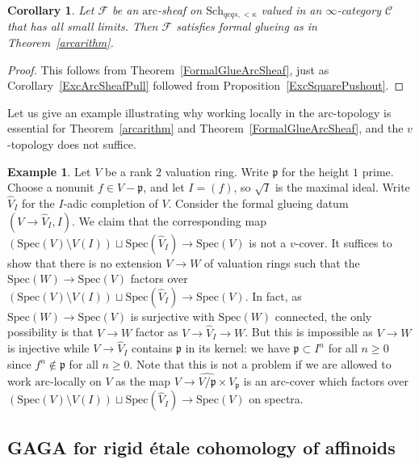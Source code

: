 \documentclass[reqno]{amsart}
\newcommand{\spec}{\mathrm{Spec}}
\newcommand{\arc}{\mathrm{arc}}
\newtheorem{corollary}[theorem]{Corollary}
\theoremstyle{definition}
\newtheorem{example}[theorem]{Example}
\begin{document}
\begin{corollary}
\label{FormalGlueArcSheafGeneral}
Let $\mathcal{F}$ be an $\arc$-sheaf on $\mathrm{Sch}_{qcqs,< \kappa}$ valued in an
$\infty$-category $\mathcal{C}$ that has all small limits. Then $\mathcal{F}$ satisfies formal glueing as in Theorem~\ref{arcarithm}. 
\end{corollary}
\begin{proof}
This follows from Theorem~\ref{FormalGlueArcSheaf}, just as Corollary~\ref{ExcArcSheafPull} followed from Proposition~\ref{ExcSquarePushout}.
\end{proof}



Let us give an example illustrating why working locally in the $\arc$-topology is essential for Theorem~\ref{arcarithm} and Theorem~\ref{FormalGlueArcSheaf}, and the $v$-topology does not suffice.

\begin{example}
\label{ExFG}
Let $V$ be a rank $2$ valuation ring. Write $\mathfrak{p}$ for the height $1$
prime. Choose a nonunit $f \in V - \mathfrak{p}$, and let $I = (f)$, so
$\sqrt{I}$ is the maximal ideal. Write $\hat{V}_I$ for the $I$-adic completion
of $V$. Consider the formal glueing datum $(V \to \hat{V}_I, I)$. We claim that
the corresponding map  $(\spec(V) \setminus V(I)) \sqcup \spec(\hat{V}_I) \to
\spec(V)$ is not a $v$-cover. It suffices to show that there is no extension $V
\to W$ of valuation rings such that the $\spec(W) \to \spec(V)$ factors over
$(\spec(V) \setminus V(I)) \sqcup \spec(\hat{V}_I) \to \spec(V)$.  In fact, as
$\spec(W) \to \spec(V)$ is surjective with $\spec(W)$ connected, the only
possibility is that $V \to W$ factor as $V \to \hat{V}_I \to W$. But this is
impossible as $V \to W$ is injective while $V \to \hat{V}_I$ contains
$\mathfrak{p}$ in its kernel: we have $\mathfrak{p} \subset I^n$  for all $n
\geq 0$ since $f^n \notin \mathfrak{p}$ for all $n \geq 0$. Note that this is
not a problem if we are allowed to work $\arc$-locally on $V$ as the map $V \to
\widehat{V/\mathfrak{p}} \times V_{\mathfrak{p}}$ is an $\arc$-cover which factors over $(\spec(V) \setminus V(I)) \sqcup \spec(\hat{V}_I) \to \spec(V)$ on spectra.
\end{example}

\subsection{GAGA for rigid \'etale cohomology of affinoids}
\end{document}
